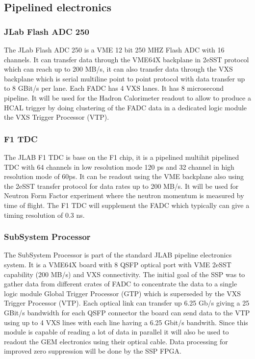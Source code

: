 \documentclass{article}
\begin{document}
\subsection{Pipelined electronics}
\label{sec:pipe}
\subsubsection{JLab Flash ADC 250}
The JLab Flash ADC 250 is a VME 12 bit 250 MHZ Flash ADC with 16 channels. It can transfer data through the VME64X backplane in 2eSST protocol which can reach up to 200 MB/s, it can also transfer data through the VXS backplane which is serial multiline point to point protocol with data transfer up to 8 GBit/s per lane. Each FADC has 4 VXS lanes. It has 8 microsecond pipeline. It will be used for the Hadron Calorimeter readout to allow to produce a HCAL trigger by doing clustering of the FADC data in a dedicated logic module the VXS Trigger Processor (VTP).  
\subsubsection{F1 TDC}
The JLAB F1 TDC is base on the F1 chip, it is a pipelined multihit pipelined TDC with 64 channels in low resolution mode 120 ps and 32 channel in high resolution mode of 60ps. It can be readout using the VME backplane also using the 2eSST transfer protocol for data rates up to 200 MB/s. It will be used for Neutron Form Factor experiment where the neutron momentum is measured by time of flight. The F1 TDC will supplement the FADC which typically can give a timing resolution of 0.3 ns.
\subsubsection{SubSystem Processor}
The SubSystem Processor is part of the standard JLAB pipeline electronics system. It is a VME64X board with 8 QSFP optical port with VME 2eSST capability (200 MB/s) and VXS connectivity.
The initial goal of the SSP was to gather data from different crates of FADC to concentrate the data to a single logic module Global Trigger Processor (GTP) which is superseded by the VXS Trigger Processor (VTP). Each optical link can transfer up 6.25 Gb/s giving a 25 GBit/s bandwidth for each QSFP connector the board can send data to the VTP using up to 4 VXS lines with each line having a 6.25 Gbit/s bandwith.
Since this module is capable of reading a lot of data in parallel it will also be used to readout the GEM electronics using their optical cable. Data processing for improved zero suppression will be done by the SSP FPGA.
\end{document}
